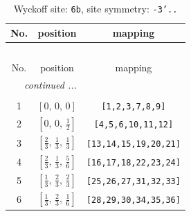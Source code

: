 \documentclass[fleqn,8pt]{jsarticle}
\begin{document}
\begin{longtable}{ccc}
\caption{Wyckoff site: {\tt 6b}, site symmetry: {\tt -3'..}}
 \\
 \hline \hline
No. & position & mapping \\ \hline \endfirsthead

\multicolumn{2}{l}{\tablename\ \thetable{}} \\
 \hline \hline
No. & position & mapping \\ \hline \endhead

 \hline \hline
\multicolumn{2}{r}{\footnotesize\it continued ...} \\ \endfoot

 \hline \hline
\multicolumn{2}{r}{} \\ \endlastfoot

1 & $\left[ 0,\, 0,\, 0 \right]$ & {\tt [1,2,3,7,8,9]} \\ \hline
2 & $\left[ 0,\, 0,\, \frac{1}{2} \right]$ & {\tt [4,5,6,10,11,12]} \\ \hline
3 & $\left[ \frac{2}{3},\, \frac{1}{3},\, \frac{1}{3} \right]$ & {\tt [13,14,15,19,20,21]} \\ \hline
4 & $\left[ \frac{2}{3},\, \frac{1}{3},\, \frac{5}{6} \right]$ & {\tt [16,17,18,22,23,24]} \\ \hline
5 & $\left[ \frac{1}{3},\, \frac{2}{3},\, \frac{2}{3} \right]$ & {\tt [25,26,27,31,32,33]} \\ \hline
6 & $\left[ \frac{1}{3},\, \frac{2}{3},\, \frac{1}{6} \right]$ & {\tt [28,29,30,34,35,36]} \\
\end{longtable}
\renewcommand{\arraystretch}{1.2}
\end{document}
